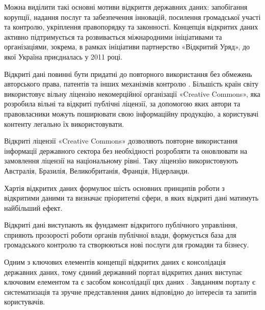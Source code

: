 Можна виділити такі основні мотиви відкриття державних
даних: запобігання корупції, надання послуг та забезпечення інновацій,
посилення громадської участі та контролю,
укріплення правопорядку та законності.
Концепція відкритих даних активно підтримується та розвивається міжнародними
ініціативами та організаціями, зокрема, в рамках ініціативи
партнерство «Відкритий Уряд», до якої Україна приєдналась у 2011
році.

Відкриті дані повинні бути придатні до повторного використання без обмежень авторського
права, патентів та інших механізмів контролю \cite{OpenDataLovers}.
Більшість країн світу використовує вільну ліцензію некомерційної
організації «Creative Commons», яка розробила вільні та відкриті
публічні ліцензії, за допомогою яких автори та правовласники можуть
поширювати свою інформаційну продукцію, а користувачі контенту
легально їх використовувати.

Відкриті ліцензії «Creative Commons» дозволяють повторне використання
інформації державного сектора без необхідності розробляти
та оновлювати на замовлення ліцензії на національному рівні.
Таку ліцензію використовують Австралія, Бразилія, Великобританія, Франція, Нідерланди.

Хартія відкритих даних формулює шість
основних принципів роботи з відкритими даними та визначає пріоритетні
сфери, в яких відкриті дані матимуть найбільший ефект.

Відкриті дані виступають як фундамент відкритого публічного управління,
сприяють прозорості роботи органів публічної влади, формується
база для громадського контролю та створюються нові послуги для
громадян та бізнесу.

Одним з ключових елементів концепції відкритих даних є консолідація державних даних,
тому єдиний державний портал відкритих даних виступає ключовим елементом
та є засобом консолідації цих даних \cite{GovPublicDataLaw}.
Завданням порталу є систематизація та зручне представлення
даних відповідно до інтересів та запитів користувачів.